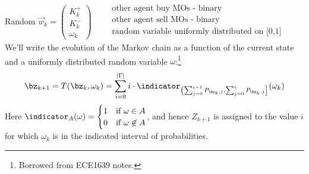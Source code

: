 \documentclass[12pt]{article}
\begin{document}
Random $\vec{w}_{k} = \begin{pmatrix}
K_k^+ \\
K_k^- \\
\omega_k
\end{pmatrix} \qquad \begin{matrix}
\text{other agent buy MOs - binary} \\
\text{other agent sell MOs - binary} \\
\text{random variable uniformly distributed on [0,1]} \\
\end{matrix}$ \\

We'll write the evolution of the Markov chain as a function of the current state and a uniformly distributed random variable $\omega$:\footnote{Borrowed from ECE1639 notes.}
\begin{equation}
\bz_{k+1} = T(\bz_k, \omega_k) = \sum_{i=0}^{|\Gamma|} i \cdot \indicator_{\left( \sum_{j=0}^{i-1} P_{\bz_k,j} , \sum_{j=0}^{i} P_{\bz_k,j} \right]} (\omega_k)
\end{equation}
Here $\indicator_A(\omega) = \begin{cases} 1 & \text{if } \omega \in A \\
0 & \text{if } \omega \not\in A
\end{cases}$, and hence $Z_{k+1}$ is assigned to the value $i$ for which $\omega_k$ is in the indicated interval of probabilities.
\end{document}
